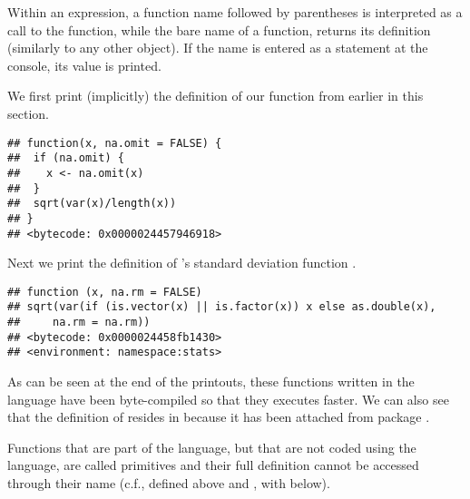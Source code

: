 \documentclass[krantz2]{krantz}\usepackage{knitr}
\begin{document}
Within an expression, a function name followed by parentheses is interpreted as a call to the function, while the bare name of a function, returns its definition (similarly to any other \Rlang object). If the name is entered as a statement at the \Rpgrm console, its value is printed.

We first print (implicitly) the definition of our function from earlier in this section.

\begin{knitrout}\footnotesize
{}\color{fgcolor}\begin{kframe}
\begin{alltt}
\end{alltt}
\begin{verbatim}
## function(x, na.omit = FALSE) {
##  if (na.omit) {
##    x <- na.omit(x)
##  }
##  sqrt(var(x)/length(x))
## }
## <bytecode: 0x0000024457946918>
\end{verbatim}
\end{kframe}
\end{knitrout}

Next we print the definition of \Rlang's standard deviation function .

\begin{knitrout}\footnotesize
{}\color{fgcolor}\begin{kframe}
\begin{alltt}
\end{alltt}
\begin{verbatim}
## function (x, na.rm = FALSE) 
## sqrt(var(if (is.vector(x) || is.factor(x)) x else as.double(x), 
##     na.rm = na.rm))
## <bytecode: 0x0000024458fb1430>
## <environment: namespace:stats>
\end{verbatim}
\end{kframe}
\end{knitrout}

As can be seen at the end of the printouts, these functions written in the \Rlang language have been byte-compiled so that they executes faster. We can also see that the definition of  resides in  because it has been attached from package .

Functions that are part of the \Rlang language, but that are not coded using the \Rlang language, are called primitives and their full definition cannot be accessed through their name (c.f.,  defined above and , with  below).
\end{document}
